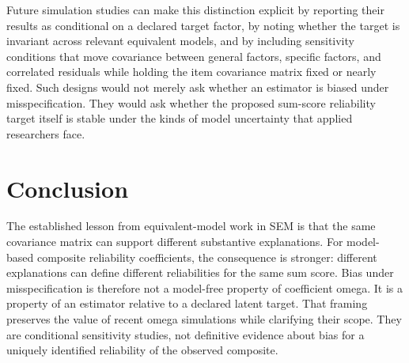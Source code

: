 \documentclass[11pt]{article}
\begin{document}
Future simulation studies can make this distinction explicit by reporting their
results as conditional on a declared target factor, by noting whether the target
is invariant across relevant equivalent models, and by including sensitivity
conditions that move covariance between general factors, specific factors, and
correlated residuals while holding the item covariance matrix fixed or nearly
fixed. Such designs would not merely ask whether an estimator is biased under
misspecification. They would ask whether the proposed sum-score reliability
target itself is stable under the kinds of model uncertainty that applied
researchers face.

\section{Conclusion}

The established lesson from equivalent-model work in SEM is that the same
covariance matrix can support different substantive explanations. For
model-based composite reliability coefficients, the consequence is stronger:
different explanations can define different reliabilities for the same sum
score. Bias under misspecification is therefore not a model-free property of
coefficient omega. It is a property of an estimator relative to a declared
latent target. That framing preserves the value of recent omega simulations
while clarifying their scope. They are conditional sensitivity studies, not
definitive evidence about bias for a uniquely identified reliability of the
observed composite.
\end{document}
